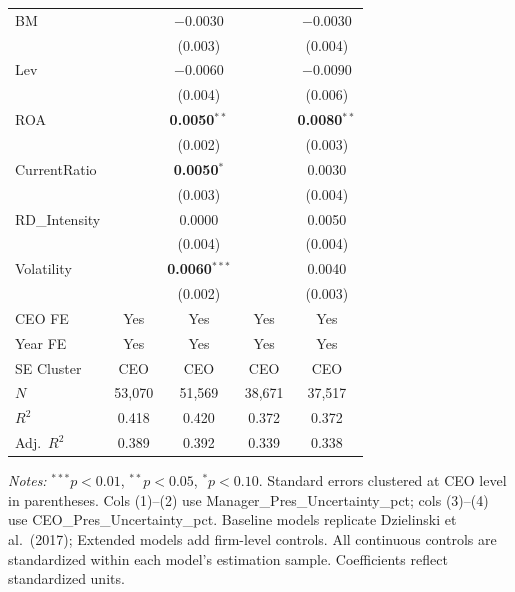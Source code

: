 \documentclass[12pt,a4paper]{article}
\begin{document}
\begin{table}[H]
\begin{threeparttable}
\begin{scriptsize}
\begin{tabular}{lcccc}
BM & & $-0.0030$ & & $-0.0030$ \\
 & & (0.003) & & (0.004) \\
Lev & & $-0.0060$ & & $-0.0090$ \\
 & & (0.004) & & (0.006) \\
ROA & & \textbf{0.0050}$^{**}$ & & \textbf{0.0080}$^{**}$ \\
 & & (0.002) & & (0.003) \\
CurrentRatio & & \textbf{0.0050}$^{*}$ & & 0.0030 \\
 & & (0.003) & & (0.004) \\
RD\_Intensity & & 0.0000 & & 0.0050 \\
 & & (0.004) & & (0.004) \\
Volatility & & \textbf{0.0060}$^{***}$ & & 0.0040 \\
 & & (0.002) & & (0.003) \\
\midrule
CEO FE & Yes & Yes & Yes & Yes \\
Year FE & Yes & Yes & Yes & Yes \\
SE Cluster & CEO & CEO & CEO & CEO \\
$N$ & 53,070 & 51,569 & 38,671 & 37,517 \\
$R^2$ & 0.418 & 0.420 & 0.372 & 0.372 \\
Adj.\ $R^2$ & 0.389 & 0.392 & 0.339 & 0.338 \\
\bottomrule
\end{tabular}
\end{scriptsize}
\begin{tablenotes}[flushleft]
\footnotesize
\item \textit{Notes:} $^{***}p<0.01$, $^{**}p<0.05$, $^{*}p<0.10$. Standard errors clustered at CEO level in parentheses. Cols (1)--(2) use Manager\_Pres\_Uncertainty\_pct; cols (3)--(4) use CEO\_Pres\_Uncertainty\_pct. Baseline models replicate Dzielinski et al.\ (2017); Extended models add firm-level controls. All continuous controls are standardized within each model's estimation sample. Coefficients reflect standardized units.
\end{tablenotes}
\end{threeparttable}
\end{table}
\end{document}
